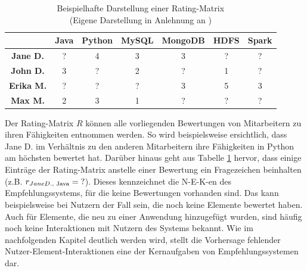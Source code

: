 \begin{table}[htbp]
    \begin{center}
    \begin{tabular}{|c||c|c|c|c|c|c|}
    \hline
    {} & {\textbf{Java}} & {\textbf{Python}} & {\textbf{MySQL}} & {\textbf{MongoDB}} & {\textbf{HDFS}} & {\textbf{Spark}}\\
    \hline
    \hline
    \textbf{Jane D.} & ? & 4 & 3 & 3 & ? & ?\\
    \hline
    \textbf{John D.} & 3 & ? & 2 & ? & 1 & ?\\
    \hline
    \textbf{Erika M.} & ? & ? & ? & 3 & 5 & 3\\
    \hline
    \textbf{Max M.} & 2 & 3 & 1 & ? & ? & ?\\
    \hline
    \end{tabular}
    \end{center}
    \caption[Beispielhafte Darstellung einer Rating-Matrix ]{Beispielhafte Darstellung einer Rating-Matrix \\
	(Eigene Darstellung in Anlehnung an \cite[S. 16]{link:booklet})}
	\label{tab1}
\end{table}

Der Rating-Matrix $R$ können alle vorliegenden Bewertungen von Mitarbeitern zu ihren Fähigkeiten entnommen werden.
So wird beispielsweise ersichtlich, dass Jane D. im Verhältnis zu den anderen Mitarbeitern ihre Fähigkeiten in Python am höchsten bewertet hat.
Darüber hinaus geht aus Tabelle \ref{tab1} hervor, dass einige Einträge der Rating-Matrix anstelle einer Bewertung ein Fragezeichen beinhalten (z.B. $r_{Jane D.\textnormal{, Java}}=\textnormal{?}$).
Dieses kennzeichnet die \ac{N-E-K}-en des Empfehlungssystems, für die keine Bewertungen vorhanden sind.
Das kann beispielsweise bei Nutzern der Fall sein, die noch keine Elemente bewertet haben.
Auch für Elemente, die neu zu einer Anwendung hinzugefügt wurden, sind häufig noch keine Interaktionen mit Nutzern des Systems bekannt.
Wie im nachfolgenden Kapitel deutlich werden wird, stellt die Vorhersage fehlender Nutzer-Element-Interaktionen eine der Kernaufgaben von Empfehlungssystemen dar.

